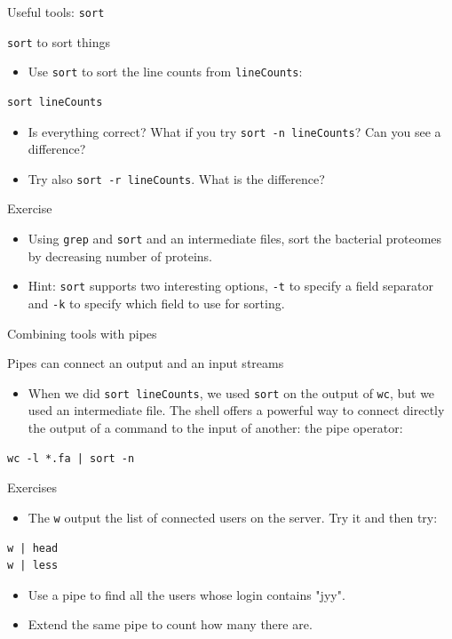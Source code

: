 \documentclass[big]{beamer}
\begin{document}
\begin{frame}[fragile,label=sec-3-6]{Useful tools: \texttt{sort}}
 \begin{block}{\texttt{sort} to sort things}
\begin{itemize}
\item Use \texttt{sort} to sort the line counts from \texttt{lineCounts}:
\end{itemize}
\begin{verbatim}
sort lineCounts
\end{verbatim}
\begin{itemize}
\item Is everything correct? What if you try \texttt{sort -n lineCounts}? Can you see a
difference?
\item Try also \texttt{sort -r lineCounts}. What is the difference?
\end{itemize}
\end{block}
\begin{block}{Exercise}
\begin{itemize}
\item Using \texttt{grep} and \texttt{sort} and an intermediate files, sort the bacterial
proteomes by decreasing number of proteins.
\item Hint: \texttt{sort} supports two interesting options, \alert{\texttt{-t}} to specify a field
separator and \alert{\texttt{-k}} to specify which field to use for sorting.
\end{itemize}
\end{block}
\end{frame}
\begin{frame}[fragile,label=sec-3-7]{Combining tools with pipes}
 \begin{block}{Pipes can connect an output and an input streams}
\begin{itemize}
\item When we did \texttt{sort lineCounts}, we used \texttt{sort} on the output of \texttt{wc}, but we
used an intermediate file. The shell offers a powerful way to connect
directly the output of a command to the input of another: the \alert{pipe
operator}:
\end{itemize}
\begin{verbatim}
wc -l *.fa | sort -n
\end{verbatim}
\end{block}
\begin{block}{Exercises}
\begin{itemize}
\item The \texttt{w} output the list of connected users on the server. Try it and then
try:
\end{itemize}
\begin{verbatim}
w | head
w | less
\end{verbatim}
\begin{itemize}
\item Use a pipe to find all the users whose login contains "jyy".
\item Extend the same pipe to count how many there are.
\end{itemize}
\end{block}
\end{frame}
\end{document}
